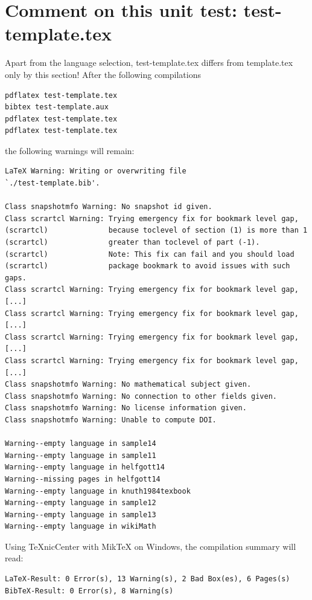 \documentclass{snapshotmfo}
\begin{document}
\section{Comment on this unit test: test-template.tex}
Apart from the language selection, test-template.tex differs from template.tex only by this section!
After the following compilations
\begin{small}
\begin{verbatim}
pdflatex test-template.tex
bibtex test-template.aux
pdflatex test-template.tex
pdflatex test-template.tex
\end{verbatim}
\end{small}
the following warnings will remain:
\begin{small}
\begin{verbatim}
LaTeX Warning: Writing or overwriting file
`./test-template.bib'.

Class snapshotmfo Warning: No snapshot id given.
Class scrartcl Warning: Trying emergency fix for bookmark level gap,
(scrartcl)              because toclevel of section (1) is more than 1
(scrartcl)              greater than toclevel of part (-1).
(scrartcl)              Note: This fix can fail and you should load
(scrartcl)              package bookmark to avoid issues with such gaps.
Class scrartcl Warning: Trying emergency fix for bookmark level gap,
[...]
Class scrartcl Warning: Trying emergency fix for bookmark level gap,
[...]
Class scrartcl Warning: Trying emergency fix for bookmark level gap,
[...]
Class scrartcl Warning: Trying emergency fix for bookmark level gap,
[...]
Class snapshotmfo Warning: No mathematical subject given.
Class snapshotmfo Warning: No connection to other fields given.
Class snapshotmfo Warning: No license information given.
Class snapshotmfo Warning: Unable to compute DOI.

Warning--empty language in sample14
Warning--empty language in sample11
Warning--empty language in helfgott14
Warning--missing pages in helfgott14
Warning--empty language in knuth1984texbook
Warning--empty language in sample12
Warning--empty language in sample13
Warning--empty language in wikiMath
\end{verbatim}
\end{small}

Using TeXnicCenter with MikTeX on Windows, the compilation summary will read:
\begin{small}
\begin{verbatim}
LaTeX-Result: 0 Error(s), 13 Warning(s), 2 Bad Box(es), 6 Pages(s)
BibTeX-Result: 0 Error(s), 8 Warning(s)
\end{verbatim}
\end{small}
\end{document}
